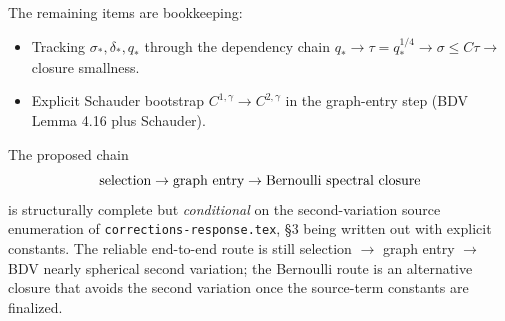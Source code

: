 \documentclass[11pt]{article}
\theoremstyle{definition}
\begin{document}
The remaining items are bookkeeping:
\begin{itemize}
\item Tracking $\sigma_*,\delta_*,q_*$ through the dependency chain
$q_*\to\tau=q_*^{1/4}\to\sigma\le C\tau\to$ closure smallness.
\item Explicit Schauder bootstrap $C^{1,\gamma}\to C^{2,\gamma}$ in the
graph-entry step (BDV Lemma 4.16 plus Schauder).
\end{itemize}

The proposed chain
\[
\hbox{selection}\to\hbox{graph entry}\to\hbox{Bernoulli spectral closure}
\]
is structurally complete but \emph{conditional} on the second-variation
source enumeration of \texttt{corrections-response.tex}, \S 3 being written
out with explicit constants. The reliable end-to-end route is still
selection $\to$ graph entry $\to$ BDV nearly spherical second variation; the
Bernoulli route is an alternative closure that avoids the second variation
once the source-term constants are finalized.
\end{document}
